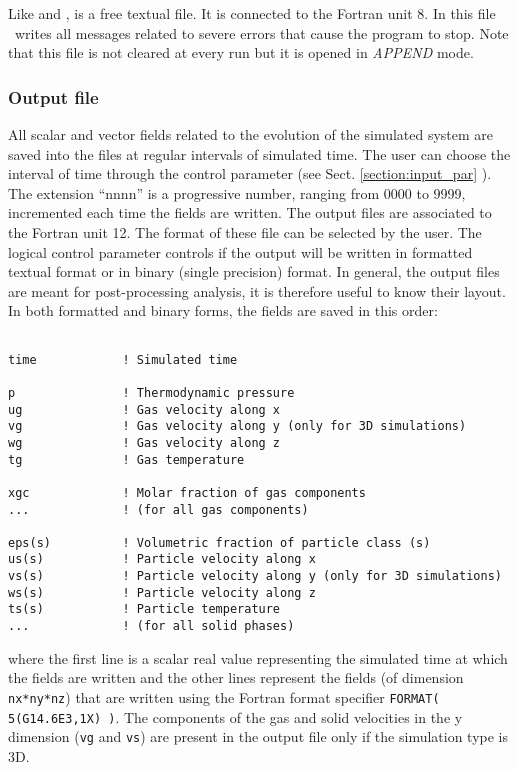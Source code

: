 Like  and ,  is a free textual file.
It is connected to the Fortran unit 8. In this file \PDAC\ writes
all messages related to severe errors that cause the program to stop.
Note that this file is not cleared at every run but it is opened in 
{\it APPEND} mode.

\subsubsection{Output file}

All scalar and vector fields related to the evolution of the simulated
system are saved into the  files at regular intervals of
simulated time. The user can choose the interval of time through
the control parameter  (see Sect. \ref{section:input_par} ).
The extension ``nnnn'' is a progressive number, ranging from 0000 to 9999, 
incremented each time the fields are written. 
The output files are associated to the Fortran unit 12. 
The format of these file can be selected by the user.
The logical control parameter  controls if the
output will be written in formatted textual format
or in binary (single precision) format. In general, the output files 
are meant for post-processing analysis, it is therefore useful to know 
their layout. In both formatted and binary forms, the fields are saved
in this order:

\begin{verbatim}

time            ! Simulated time

p               ! Thermodynamic pressure
ug              ! Gas velocity along x
vg              ! Gas velocity along y (only for 3D simulations)
wg              ! Gas velocity along z
tg              ! Gas temperature

xgc             ! Molar fraction of gas components
...             ! (for all gas components)

eps(s)          ! Volumetric fraction of particle class (s)
us(s)           ! Particle velocity along x
vs(s)           ! Particle velocity along y (only for 3D simulations)
ws(s)           ! Particle velocity along z
ts(s)           ! Particle temperature
...             ! (for all solid phases)

\end{verbatim}

where the first line is a scalar real value representing the 
simulated time at which the fields are written and the other lines
represent the fields (of dimension {\tt nx*ny*nz}) that are written 
using the Fortran format specifier {\tt FORMAT( 5(G14.6E3,1X) )}.
The components of the gas and solid velocities in the y dimension
({\tt vg} and {\tt vs}) are present in the output file only if the simulation
type is 3D.

